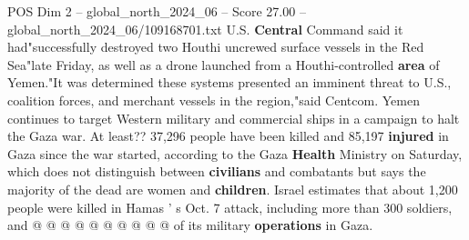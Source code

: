 \begin{textsample}{POS Dim 2 – global\_north\_2024\_06 – Score 27.00 – global\_north\_2024\_06/109168701.txt}
U.S. \textbf{Central} Command said it had"successfully destroyed two Houthi uncrewed surface vessels in the Red Sea"late Friday, as well as a drone launched from a Houthi-controlled \textbf{area} of Yemen."It was determined these systems presented an imminent threat to U.S., coalition forces, and merchant vessels in the region,"said Centcom.
Yemen continues to target Western military and commercial ships in a campaign to halt the Gaza war.
At least?? 37,296 people have been killed and 85,197 \textbf{injured} in Gaza since the war started, according to the Gaza \textbf{Health} Ministry on Saturday, which does not distinguish between \textbf{civilians} and combatants but says the majority of the dead are women and \textbf{children}.
Israel estimates that about 1,200 people were killed in Hamas ' s Oct. 7 attack, including more than 300 soldiers, and @ @ @ @ @ @ @ @ @ @ of its military \textbf{operations} in Gaza.

\end{textsample}
